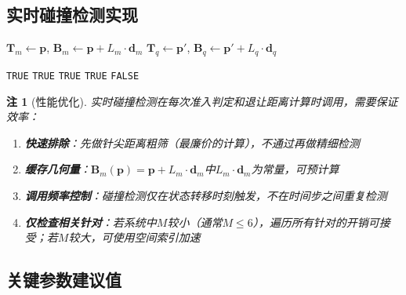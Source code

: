 \documentclass[11pt,a4paper]{article}
\newtheorem{remark}{注}[section]
\begin{document}
\subsection{实时碰撞检测实现}

\begin{algorithm}[H]
\caption{实时碰撞检测函数实现}
\begin{algorithmic}[1]
    \State $\mathbf{T}_m \leftarrow \mathbf{p}$, \quad $\mathbf{B}_m \leftarrow \mathbf{p} + L_m \cdot \mathbf{d}_m$
    \State $\mathbf{T}_q \leftarrow \mathbf{p}'$, \quad $\mathbf{B}_q \leftarrow \mathbf{p}' + L_q \cdot \mathbf{d}_q$
    
     \Return \texttt{TRUE} \EndIf {}
     \Return \texttt{TRUE} \EndIf {}
     \Return \texttt{TRUE} \EndIf
     \Return \texttt{TRUE} \EndIf {}
    \State \Return \texttt{FALSE}
\EndFunction
\end{algorithmic}
\end{algorithm}

\begin{remark}[性能优化]
实时碰撞检测在每次准入判定和退让距离计算时调用，需要保证效率：
\begin{enumerate}
    \item \textbf{快速排除}：先做针尖距离粗筛（最廉价的计算），不通过再做精细检测
    \item \textbf{缓存几何量}：$\mathbf{B}_m(\mathbf{p}) = \mathbf{p} + L_m \cdot \mathbf{d}_m$中$L_m \cdot \mathbf{d}_m$为常量，可预计算
    \item \textbf{调用频率控制}：碰撞检测仅在状态转移时刻触发，不在时间步之间重复检测
    \item \textbf{仅检查相关针对}：若系统中$M$较小（通常$M \leq 6$），遍历所有针对的开销可接受；若$M$较大，可使用空间索引加速
\end{enumerate}
\end{remark}

\subsection{关键参数建议值}
\end{document}
